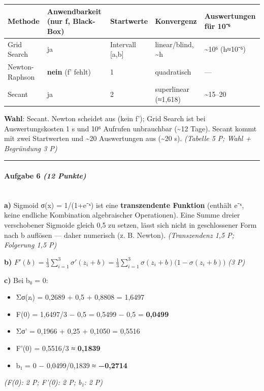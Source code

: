\documentclass[11pt, a4paper]{article}
\begin{document}
{\small
\begin{tabularx}{\linewidth}{XXXXX}
\hline
\rowcolor{tableheadbg}
{\color{white}\textbf{Methode}} & {\color{white}\textbf{Anwendbarkeit (nur f, Black-Box)}} & {\color{white}\textbf{Startwerte}} & {\color{white}\textbf{Konvergenz}} & {\color{white}\textbf{Auswertungen für 10⁻⁶}} \\[2pt]
\hline
\endhead
\hline
\endfoot
Grid Search & ja & Intervall [a,b] & linear/blind, \textasciitilde{}h & \textasciitilde{}10⁶ (h≈10⁻⁶) \\
Newton-Raphson & \textbf{nein} (f' fehlt) & 1 & quadratisch & — \\
Secant & ja & 2 & superlinear (≈1,618) & \textasciitilde{}15–20 \\
\end{tabularx}
}


\textbf{Wahl}: Secant. Newton scheidet aus (kein f'); Grid Search ist bei Auswertungskosten 1 s und 10⁶ Aufrufen unbrauchbar (\textasciitilde{}12 Tage). Secant kommt mit zwei Startwerten und \textasciitilde{}20 Auswertungen aus (\textasciitilde{}20 s). \textit{(Tabelle 5 P; Wahl + Begründung 3 P)}



\noindent\textcolor{rulegray}{\rule{\linewidth}{0.4pt}}


\paragraph{Aufgabe 6 \textit{(12 Punkte)}}\mbox{}\\[2pt]

\textbf{a)} Sigmoid σ(x) = 1/(1+e⁻ˣ) ist eine \textbf{transzendente Funktion} (enthält e⁻ˣ, keine endliche Kombination algebraischer Operationen). Eine Summe dreier verschobener Sigmoide gleich 0,5 zu setzen, lässt sich nicht in geschlossener Form nach b auflösen — daher numerisch (z. B. Newton). \textit{(Transzendenz 1,5 P; Folgerung 1,5 P)}


\textbf{b)} $F'(b) = \frac{1}{3}\sum_{i=1}^{3}\sigma'(z_i + b) = \frac{1}{3}\sum_{i=1}^{3}\sigma(z_i+b)\bigl(1-\sigma(z_i+b)\bigr)$ \textit{(3 P)}


\textbf{c)} Bei b₀ = 0:

\begin{itemize}
  \item Σσ(zᵢ) = 0,2689 + 0,5 + 0,8808 = 1,6497
  \item F(0) = 1,6497/3 − 0,5 = 0,5499 − 0,5 = \textbf{0,0499}
  \item Σσ' = 0,1966 + 0,25 + 0,1050 = 0,5516
  \item F'(0) = 0,5516/3 ≈ \textbf{0,1839}
  \item b₁ = 0 − 0,0499/0,1839 ≈ \textbf{−0,2714}
\end{itemize}

\textit{(F(0): 2 P; F'(0): 2 P; b₁: 2 P)}





\end{document}
